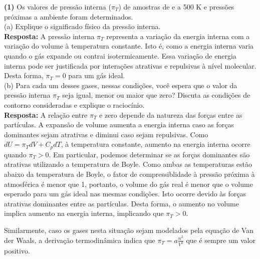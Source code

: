 \textbf{(1)} Os valores de pressão interna (\(\pi_T\)) de amostras de  e
 a 500 K e pressões próximas a ambiente foram determinados.\\

(a) Explique o significado físico da pressão interna.\\

\textbf{Resposta:}   A pressão interna \( \pi_T \) representa a variação da energia interna com a
   variação do volume à temperatura constante. Isto é, como a energia
   interna varia quando o gás expande ou contrai isotermicamente. Essa variação
   de energia interna pode ser justificada por interações atrativas e repulsivas
   à nível molecular. Desta forma, \( \pi_T = 0 \) para um gás ideal.\\ 

(b) Para cada um desses gases, nessas condições, você espera que o valor da
pressão interna \(\pi_T\)  seja igual, menor ou maior que zero? Discuta as
condições de contorno consideradas e explique o raciocínio.\\

\textbf{Resposta:} A relação entre \( \pi_T \) e zero depende da natureza das
forças entre as partículas. A expansão de volume aumenta a energia interna caso
as forças dominantes sejam atrativas e diminui caso sejam repulsivas. Como \( dU
= \pi_T dV + C_p dT \), à temperatura constante, aumento na energia interna ocorre
quando \( \pi_T > 0 \). Em particular, podemos determinar se as forças
dominantes são atrativas utilizando a temperatura de Boyle. Como ambas as
temperaturas estão abaixo da temperatura de Boyle, o fator de compressiblidade à
pressão próxima à atmosférica é menor que 1, portanto, o volume do gás real é
menor que o volume esperado para um gás ideal nas mesmas condições. Isto ocorre
devido às forças atrativas dominantes entre as partículas. Desta forma, o
aumento no volume implica aumento na energia interna, implicando que \( \pi_T >
0 \).

Similarmente, caso os gases nesta situação sejam modelados pela equação de Van
der Waals, a derivação termodinâmica indica que \( \pi_T = a \frac{n^2}{V^2} \)
que é sempre um valor positivo.

